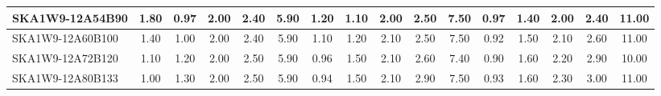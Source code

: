 \begin{table}[H]
{{\begin{tabular}{|lccccc||ccccc||ccccc|}
SKA1W9-12A54B90 & 1.80 \cellcolor{blue!60.00} & 0.97 \cellcolor{red!18.00} & 2.00 \cellcolor{green!18.00} & 2.40 \cellcolor{orange!18.00} & 5.90 \cellcolor{purple!60.00} & 1.20 \cellcolor{blue!41.74} & 1.10 \cellcolor{red!18.00} & 2.00 \cellcolor{green!18.00} & 2.50 \cellcolor{orange!18.00} & 7.50 \cellcolor{purple!60.00} & 0.97 \cellcolor{blue!23.88} & 1.40 \cellcolor{red!18.00} & 2.00 \cellcolor{green!18.00} & 2.40 \cellcolor{orange!18.00} & 11.00 \cellcolor{purple!60.00}\\ \hline 
SKA1W9-12A60B100 & 1.40 \cellcolor{blue!39.00} & 1.00 \cellcolor{red!20.00} & 2.00 \cellcolor{green!18.00} & 2.40 \cellcolor{orange!18.00} & 5.90 \cellcolor{purple!60.00} & 1.10 \cellcolor{blue!32.61} & 1.20 \cellcolor{red!26.40} & 2.10 \cellcolor{green!39.00} & 2.50 \cellcolor{orange!18.00} & 7.50 \cellcolor{purple!60.00} & 0.92 \cellcolor{blue!19.68} & 1.50 \cellcolor{red!39.00} & 2.10 \cellcolor{green!32.00} & 2.60 \cellcolor{orange!32.00} & 11.00 \cellcolor{purple!60.00}\\ \hline 
SKA1W9-12A72B120 & 1.10 \cellcolor{blue!23.25} & 1.20 \cellcolor{red!33.33} & 2.00 \cellcolor{green!18.00} & 2.50 \cellcolor{orange!39.00} & 5.90 \cellcolor{purple!60.00} & 0.96 \cellcolor{blue!19.83} & 1.50 \cellcolor{red!51.60} & 2.10 \cellcolor{green!39.00} & 2.60 \cellcolor{orange!28.50} & 7.40 \cellcolor{purple!49.50} & 0.90 \cellcolor{blue!18.00} & 1.60 \cellcolor{red!60.00} & 2.20 \cellcolor{green!46.00} & 2.90 \cellcolor{orange!53.00} & 10.00 \cellcolor{purple!18.00}\\ \hline 
SKA1W9-12A80B133 & 1.00 \cellcolor{blue!18.00} & 1.30 \cellcolor{red!40.00} & 2.00 \cellcolor{green!18.00} & 2.50 \cellcolor{orange!39.00} & 5.90 \cellcolor{purple!60.00} & 0.94 \cellcolor{blue!18.00} & 1.50 \cellcolor{red!51.60} & 2.10 \cellcolor{green!39.00} & 2.90 \cellcolor{orange!60.00} & 7.50 \cellcolor{purple!60.00} & 0.93 \cellcolor{blue!20.52} & 1.60 \cellcolor{red!60.00} & 2.30 \cellcolor{green!60.00} & 3.00 \cellcolor{orange!60.00} & 11.00 \cellcolor{purple!60.00}\\ \hline 
\end{tabular}}
\vspace{-0.300000cm}
\hspace{1cm} 
}
\end{table}
